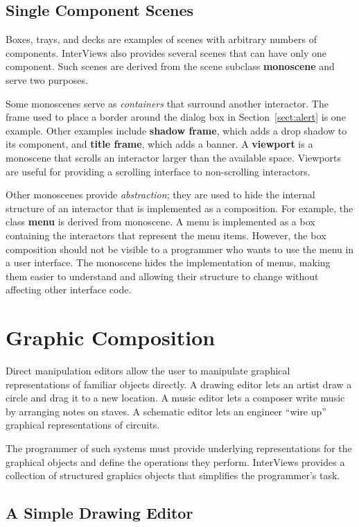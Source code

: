    \subsection{Single Component Scenes}
Boxes, trays, and decks are examples of scenes with arbitrary
numbers of components.  InterViews also provides several scenes that
can have only one component.  Such scenes are derived from the
scene subclass {\bf monoscene} and serve two purposes.

Some monoscenes serve as {\em containers\/} that surround another
interactor.  The frame used to place a border around the dialog box in
Section~\ref{sect:alert} is one example.  Other examples include {\bf
shadow frame}, which adds a drop shadow to its component, and {\bf
title frame}, which adds a banner.  A {\bf viewport} is a monoscene
that scrolls an interactor larger than the available space.  Viewports
are useful for providing a scrolling interface to non-scrolling
interactors.

Other monoscenes provide {\em abstraction}; they are used to hide the
internal structure of an interactor that is implemented as a
composition.  For example, the class {\bf menu} is derived from
monoscene.  A menu is implemented as a box containing the interactors
that represent the menu items.
However, the box
composition should not be visible to a programmer who wants to use the
menu in a user interface.  The monoscene hides the implementation of
menus, making them easier to understand and allowing their structure
to change without affecting other interface code.

\section{Graphic Composition}

Direct manipulation editors allow the user to manipulate graphical
representations of familiar objects directly.  A drawing editor lets
an artist
draw a circle and drag it to a new location.  A
music editor lets a composer write music by arranging notes on staves.  A
schematic editor lets an engineer ``wire up'' graphical representations of
circuits.  

The programmer of such systems must provide underlying representations
for the graphical objects and define the operations they perform.
InterViews provides a collection of structured graphics
objects that simplifies the programmer's task.

    \subsection{A Simple Drawing Editor\label{sect:minidraw}}

